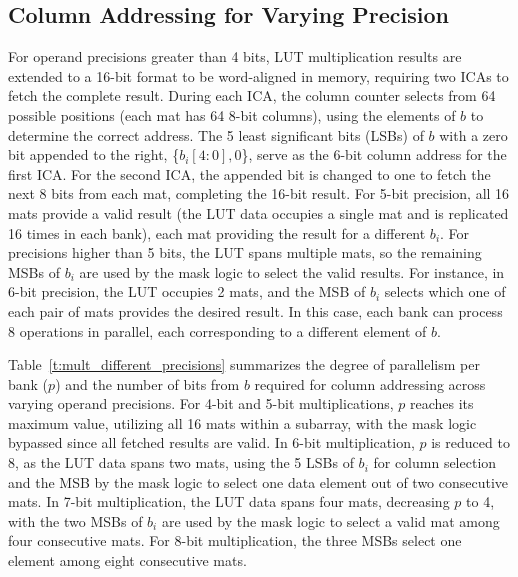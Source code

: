 \subsection{Column Addressing for Varying Precision}
For operand precisions greater than 4 bits, LUT multiplication results are extended to a 16-bit format to be word-aligned in memory, requiring two ICAs to fetch the complete result. During each ICA, the column counter selects from 64 possible positions (each mat has 64 8-bit columns), using the elements of $b$ to determine the correct address. The 5 least significant bits (LSBs) of $b$ with a zero bit appended to the right, \{$b_{i}[4:0], 0$\}, serve as the 6-bit column address for the first ICA. For the second ICA, the appended bit is changed to one to fetch the next 8 bits from each mat, completing the 16-bit result. For 5-bit precision, all 16 mats provide a valid result (the LUT data occupies a single mat and is replicated 16 times in each bank), each mat providing the result for a different $b_{i}$. For precisions higher than 5 bits, the LUT spans multiple mats, so the remaining MSBs of $b_{i}$ are used by the mask logic to select the valid results. For instance, in 6-bit precision, the LUT occupies 2 mats, and the MSB of $b_{i}$ selects which one of each pair of mats provides the desired result. In this case, each bank can process 8 operations in parallel, each corresponding to a different element of $b$.

Table~\ref{t:mult_different_precisions} summarizes the degree of parallelism per bank ($p$) and the number of bits from $b$ required for column addressing across varying operand precisions. For 4-bit and 5-bit multiplications, $p$ reaches its maximum value, utilizing all 16 mats within a subarray, with the mask logic bypassed since all fetched results are valid. In 6-bit multiplication, $p$ is reduced to 8, as the LUT data spans two mats, using the 5 LSBs of $b_i$ for column selection and the MSB by the mask logic to select one data element out of two consecutive mats. In 7-bit multiplication, the LUT data spans four mats, decreasing $p$ to 4, with the two MSBs of $b_i$ are used by the mask logic to select a valid mat among four consecutive mats. For 8-bit multiplication, the three MSBs select one element among eight consecutive mats.

